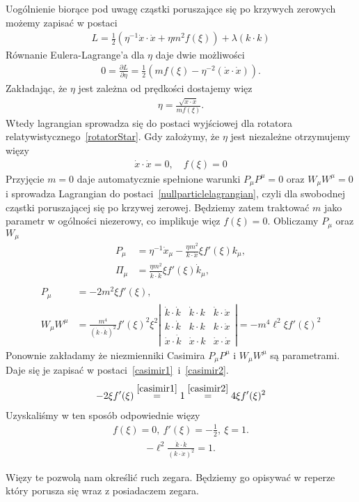 Uogólnienie biorące pod uwagę cząstki poruszające się
po krzywych zerowych możemy zapisać w 
postaci~\cite{polchinski_1998}
\begin{align*}
L =  \frac{1}{2} \left(  
\eta^{-1} \dot{x} \cdot \dot{x} +  \eta m^2 f( \xi ) \right)  
+ \lambda ( k\cdot k )
\end{align*}
Równanie Eulera-Lagrange'a dla $\eta$ daje dwie możliwości
\begin{align*}
0 = \frac{\partial L }{\partial \eta} =  \frac{1}{2}
\left(m f(\xi) - \eta^{-2} ( \dot{x} \cdot \dot{x} )
  \right).
\end{align*}
Zakładając, że $\eta$ jest zależna od prędkości 
dostajemy więz
\begin{align*}
\eta = \frac{\sqrt{\dot{x} \cdot \dot{x}}}{m f(\xi)}.
\end{align*}
Wtedy lagrangian sprowadza się do postaci wyjściowej 
dla rotatora relatywistycznego~\ref{rotatorStar}.
Gdy założymy, że $\eta$ jest niezależne otrzymujemy
więzy 
\begin{align*}
\dot{x} \cdot \dot{x} = 0, \quad f(\xi) = 0
\end{align*}
Przyjęcie $m =0$ daje automatycznie spełnione warunki 
$P_\mu P^\mu =0$ oraz $W_\mu W^\mu = 0$ i sprowadza 
Lagrangian do postaci~\ref{nullparticlelagrangian}, 
czyli dla swobodnej cząstki 
poruszającej się po krzywej zerowej.
Będziemy zatem traktować $m$ jako parametr w ogólności
niezerowy, co implikuje więz $f(\xi)=0$.
Obliczamy $P_\mu$ oraz $W_\mu$
\begin{align*}
P_\mu &= \eta^{-1} \dot{x}_\mu - 
\frac{\eta m^2}{k\cdot \dot{x}} \xi f'(\xi) k_\mu,\\
\Pi_\mu &= \frac{\eta m^2}{\dot{k}\cdot \dot{k}}
\xi f'(\xi) \dot{k}_\mu, \\
\end{align*}
\begin{align*}
P_\mu &= -2 m^2 \xi f'(\xi),\\
W_\mu W^\mu &= \frac{m^4}{(\dot{k}\cdot \dot{k})^2}
f'(\xi)^2 \xi^2 
\left| 
\begin{array}{ccc}
\dot{k} \cdot \dot{k}& \dot{k} \cdot k& \dot{k} \cdot \dot{x}\\
k \cdot \dot{k}& k \cdot k &k  \cdot \dot{x}\\
\dot{x} \cdot \dot{k}& \dot{x} \cdot k &\dot{x} \cdot \dot{x}
\end{array}
\right|= 
- m^4 \ell^2 \xi f'(\xi)^2
\end{align*}
Ponownie zakładamy
że niezmienniki Casimira $P_\mu P^\mu$ i $W_\mu W^\mu$ 
są parametrami. Daje się 
je zapisać w postaci~\ref{casimir1}~i~\ref{casimir2}.
\begin{align*} 
 -2 \xi f'(\xi)
\stackrel{\ref{casimir1}}{=} 1 \stackrel{\ref{casimir2}}{=}
  4  \xi f'(\xi)^2
\end{align*}
Uzyskaliśmy w ten sposób odpowiednie więzy 
\begin{align*}
f(\xi) = 0, \ f'(\xi) =- \frac{1}{2},\ \xi = 1.
\end{align*}
\begin{align} \label{wiez}
 - \ell^2 \frac{\dot{k} \cdot \dot{k}}{ ( k \cdot \dot{x})^2 } = 1.
\end{align}

Więzy te pozwolą nam określić ruch zegara. 
Będziemy go opisywać w reperze który porusza się 
wraz z posiadaczem zegara.  
